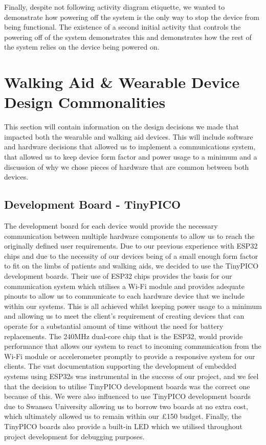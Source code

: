                         Finally, despite not following activity diagram etiquette, we wanted to demonstrate how powering off the system is the only way to stop the device from being functional. The existence of a second initial activity that controls the powering off of the system demonstrates this and demonstrates how the rest of the system relies on the device being powered on.
        
            \section{Walking Aid \& Wearable Device Design Commonalities}
            \label{sec:both_devices}
        
                This section will contain information on the design decisions we made that impacted both the wearable and walking aid devices. This will include software and hardware decisions that allowed us to implement a communications system, that allowed us to keep device form factor and power usage to a minimum and a discussion of why we chose pieces of hardware that are common between both devices.
        
                \subsection{Development Board - TinyPICO}
                \label{subsec:development_board}
        
                    The development board for each device would provide the necessary communication between multiple hardware components to allow us to reach the originally defined user requirements. Due to our previous experience with ESP32 chips and due to the necessity of our devices being of a small enough form factor to fit on the limbs of patients and walking aids, we decided to use the TinyPICO development boards. Their use of ESP32 chips provides the basis for our communication system which utilises a Wi-Fi module and provides adequate pinouts to allow us to communicate to each hardware device that we include within our systems. This is all achieved whilst keeping power usage to a minimum and allowing us to meet the client's requirement of creating devices that can operate for a substantial amount of time without the need for battery replacements. The 240MHz dual-core chip that is the ESP32, would provide performance that allows our system to react to incoming communication from the Wi-Fi module or accelerometer promptly to provide a responsive system for our clients. The vast documentation supporting the development of embedded systems using ESP32s was instrumental in the success of our project, and we feel that the decision to utilise TinyPICO development boards was the correct one because of this. We were also influenced to use TinyPICO development boards due to Swansea University allowing us to borrow two boards at no extra cost, which ultimately allowed us to remain within our £150 budget. Finally, the TinyPICO boards also provide a built-in LED which we utilised throughout project development for debugging purposes.
        

